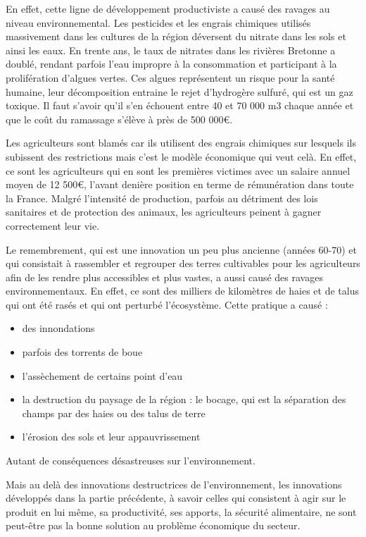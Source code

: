 \documentclass[a4paper,10pt]{report}
\begin{document}
			En effet, cette ligne de développement productiviste a causé des ravages au niveau environnemental. Les pesticides et les engrais chimiques utilisés massivement dans les cultures de la région déversent du nitrate dans les sols et ainsi les eaux. En trente ans, le taux de nitrates dans les rivières Bretonne a doublé, rendant parfois l’eau impropre à la consommation et participant à la prolifération d’algues vertes. Ces algues représentent un risque pour la santé humaine, leur décomposition entraine le rejet d’hydrogère sulfuré, qui est un gaz toxique. Il faut s’avoir qu’il s’en échouent entre 40 et 70 000 m3 chaque année et que le coût du ramassage s’élève à près de 500 000\euro.
			
			Les agriculteurs sont blamés car ils utilisent des engrais chimiques sur lesquels ils subissent des restrictions mais c’est le modèle économique qui veut celà. En effet, ce sont les agriculteurs qui en sont les premières victimes avec un salaire annuel moyen de 12 500\euro, l’avant denière position en terme de rémunération dans toute la France. Malgré l’intensité de production, parfois au détriment des lois sanitaires et de protection des animaux, les agriculteurs peinent à gagner correctement leur vie.
			
			
			Le remembrement, qui est une innovation un peu plus ancienne (années 60-70) et qui consistait à rassembler et regrouper des terres cultivables pour les agriculteurs afin de les rendre plus accessibles et plus vastes, a aussi causé des ravages environnementaux. En effet, ce sont des milliers de kilomètres de haies et de talus qui ont été rasés et qui ont perturbé l’écosystème. Cette pratique a causé :
			\begin{itemize}
				\item des innondations
				\item parfois des torrents de boue
				\item l’assèchement de certains point d’eau
				\item la destruction du paysage de la région : le bocage, qui est la séparation des champs par des haies ou des talus de terre
				\item l’érosion des sols et leur appauvrissement
			\end{itemize}
			
			Autant de conséquences désastreuses sur l’environnement.	
			
			Mais au delà des innovations destructrices de l’environnement, les innovations développés dans la partie précédente, à savoir celles qui consistent à agir sur le produit en lui même, sa productivité, ses apports, la sécurité alimentaire, ne sont peut-être pas la bonne solution au problème économique du secteur.
			
\end{document}
